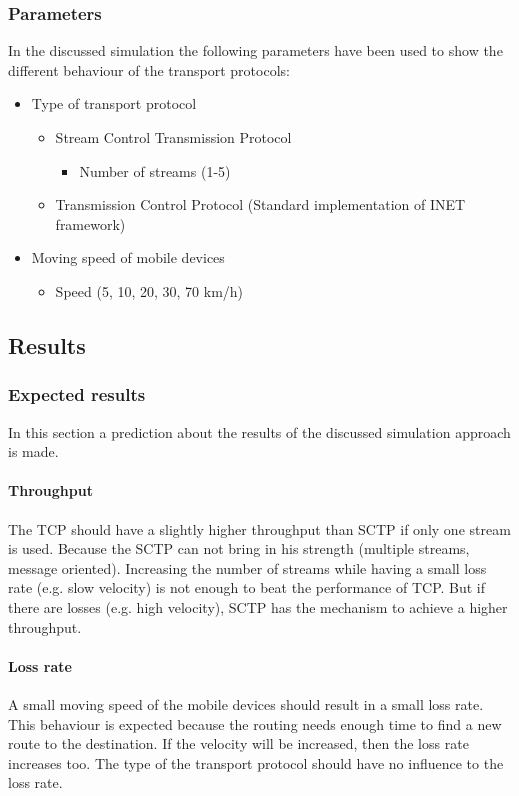 \documentclass[a4paper]{article}
\begin{document}
\subsubsection{Parameters}
In the discussed simulation the following parameters have been used to show the different behaviour of the transport protocols:
\begin{itemize}
	\item Type of transport protocol
	\begin{itemize}
		\item Stream Control Transmission Protocol
		\begin{itemize}
			\item Number of streams (1-5)
		\end{itemize}
    	\item Transmission Control Protocol (Standard implementation of INET framework)
	\end{itemize}
	\item Moving speed of mobile devices
	\begin{itemize}
		\item Speed (5, 10, 20, 30, 70 km/h)
	\end{itemize}
\end{itemize}	

\subsection{Results}
\subsubsection{Expected results}
In this section a prediction about the results of the discussed simulation approach is made.

\paragraph{Throughput}
The TCP should have a slightly higher throughput than SCTP if only one stream is used. Because the SCTP can not bring in his strength (multiple streams, message oriented). Increasing the number of streams while having a small loss rate (e.g. slow velocity) is not enough to beat the performance of TCP. But if there are losses (e.g. high velocity), SCTP has the mechanism to achieve a higher throughput.
\paragraph{Loss rate}
A small moving speed of the mobile devices should result in a small loss rate. This behaviour is expected because the routing needs enough time to find a new route to the destination. If the velocity will be increased, then the loss rate increases too. The type of the transport protocol should have no influence to the loss rate.
\end{document}
